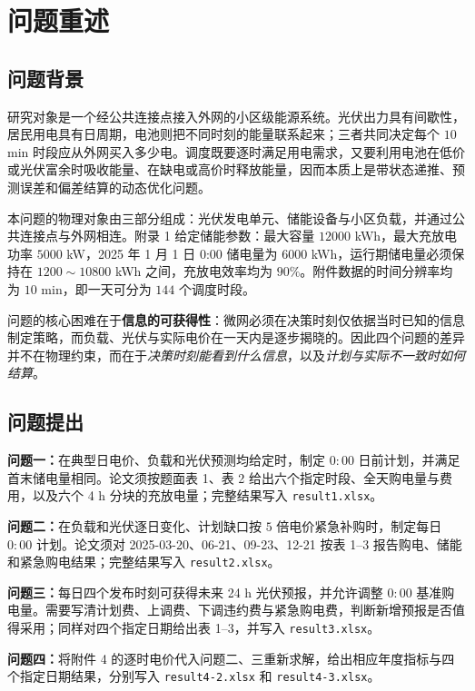\section{问题重述}

\subsection{问题背景}

研究对象是一个经公共连接点接入外网的小区级能源系统。光伏出力具有间歇性，居民用电具有日周期，电池则把不同时刻的能量联系起来；三者共同决定每个 $10$ min 时段应从外网买入多少电。调度既要逐时满足用电需求，又要利用电池在低价或光伏富余时吸收能量、在缺电或高价时释放能量，因而本质上是带状态递推、预测误差和偏差结算的动态优化问题。

本问题的物理对象由三部分组成：光伏发电单元、储能设备与小区负载，并通过公共连接点与外网相连。附录 1 给定储能参数：最大容量 $12000$ kWh，最大充放电功率 $5000$ kW，2025 年 1 月 1 日 0:00 储电量为 $6000$ kWh，运行期储电量必须保持在 $1200\sim10800$ kWh 之间，充放电效率均为 $90\%$。附件数据的时间分辨率均为 $10$ min，即一天可分为 $144$ 个调度时段。

问题的核心困难在于\textbf{信息的可获得性}：微网必须在决策时刻仅依据当时已知的信息制定策略，而负载、光伏与实际电价在一天内是逐步揭晓的。因此四个问题的差异并不在物理约束，而在于\emph{决策时刻能看到什么信息}，以及\emph{计划与实际不一致时如何结算}。

\subsection{问题提出}

\indent\textbf{问题一：}在典型日电价、负载和光伏预测均给定时，制定 $0{:}00$ 日前计划，并满足首末储电量相同。论文须按题面表 1、表 2 给出六个指定时段、全天购电量与费用，以及六个 4 h 分块的充放电量；完整结果写入 \texttt{result1.xlsx}。

\indent\textbf{问题二：}在负载和光伏逐日变化、计划缺口按 $5$ 倍电价紧急补购时，制定每日 $0{:}00$ 计划。论文须对 2025-03-20、06-21、09-23、12-21 按表 1--3 报告购电、储能和紧急购电结果；完整结果写入 \texttt{result2.xlsx}。

\indent\textbf{问题三：}每日四个发布时刻可获得未来 24 h 光伏预报，并允许调整 $0{:}00$ 基准购电量。需要写清计划费、上调费、下调违约费与紧急购电费，判断新增预报是否值得采用；同样对四个指定日期给出表 1--3，并写入 \texttt{result3.xlsx}。

\indent\textbf{问题四：}将附件 4 的逐时电价代入问题二、三重新求解，给出相应年度指标与四个指定日期结果，分别写入 \texttt{result4-2.xlsx} 和 \texttt{result4-3.xlsx}。

